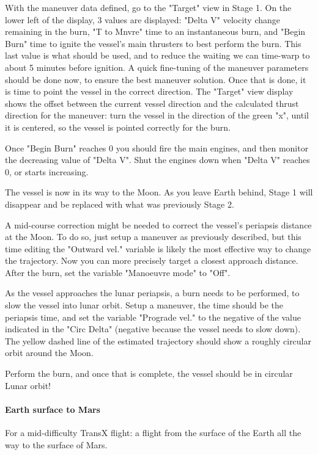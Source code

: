 \documentclass[Orbiter User Manual.tex]{subfiles}
\begin{document}
With the maneuver data defined, go to the "Target" view in Stage 1. On the lower
left of the display, 3 values are displayed: "Delta V" velocity change remaining
in the burn, "T to Mnvre" time to an instantaneous burn, and "Begin Burn" time
to ignite the vessel's main thrusters to best perform the burn. This last value
is what should be used, and to reduce the waiting we can time-warp to about 5
minutes before ignition.
A quick fine-tuning of the maneuver parameters should be done now, to ensure the
best maneuver solution. Once that is done, it is time to point the vessel in the
correct direction. The "Target" view display shows the offset between the
current vessel direction and the calculated thrust direction for the maneuver:
turn the vessel in the direction of the green "x", until it is centered, so the
vessel is pointed correctly for the burn.

Once "Begin Burn" reaches 0 you should fire the main engines, and then monitor
the decreasing value of "Delta V". Shut the engines down when "Delta V" reaches
0, or starts increasing.

The vessel is now in its way to the Moon. As you leave Earth behind, Stage 1
will disappear and be replaced with what was previously Stage 2.

A mid-course correction might be needed to correct the vessel's periapsis
distance at the Moon. To do so, just setup a maneuver as previously described,
but this time editing the "Outward vel." variable is likely the most effective
way to change the trajectory. Now you can more precisely target a closest
approach distance. After the burn, set the variable "Manoeuvre mode" to "Off".

As the vessel approaches the lunar periapsis, a burn needs to be performed, to
slow the vessel into lunar orbit. Setup a maneuver, the time should be the
periapsis time, and set the variable "Prograde vel." to the negative of the
value indicated in the "Circ Delta" (negative because the vessel needs to slow
down). The yellow dashed line of the estimated trajectory should show a roughly
circular orbit around the Moon.

Perform the burn, and once that is complete, the vessel should be in circular
Lunar orbit!


\paragraph{Earth surface to Mars}
For a mid-difficulty TransX flight: a flight from the surface of the Earth all
the way to the surface of Mars.
\end{document}
